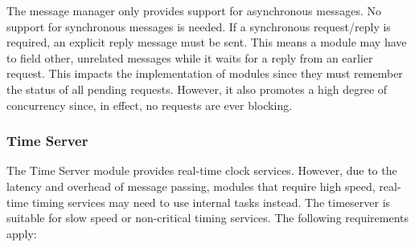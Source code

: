 The message manager only provides support for asynchronous messages. No support for synchronous
messages is needed. If a synchronous request/reply is required, an explicit reply message must
be sent. This means a module may have to field other, unrelated messages while it waits for a
reply from an earlier request. This impacts the implementation of modules since they must
remember the status of all pending requests.  However, it also promotes a high degree of concurrency since, in effect,
no requests are ever blocking.

\subsubsection{Time Server}
\label{sec:requirements-time-server}

The Time Server module provides real-time clock services. However, due to the latency and
overhead of message passing, modules that require high speed, real-time timing services may need
to use internal tasks instead. The timeserver is suitable for slow speed or non-critical timing
services.  The following requirements apply:

